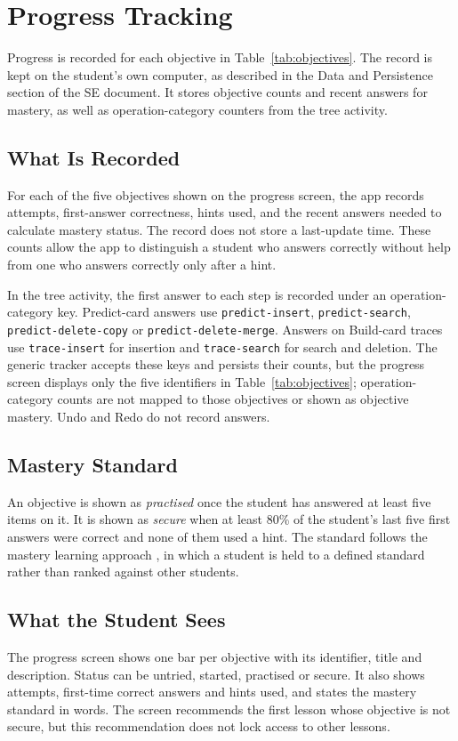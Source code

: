 \section{Progress Tracking}\label{sec:id-progress}

Progress is recorded for each objective in Table~\ref{tab:objectives}. The record is kept on the student's own computer, as described in the Data and Persistence section of the SE document. It stores objective counts and recent answers for mastery, as well as operation-category counters from the tree activity.

\subsection{What Is Recorded}
For each of the five objectives shown on the progress screen, the app records attempts, first-answer correctness, hints used, and the recent answers needed to calculate mastery status. The record does not store a last-update time. These counts allow the app to distinguish a student who answers correctly without help from one who answers correctly only after a hint.

In the tree activity, the first answer to each step is recorded under an operation-category key. Predict-card answers use \texttt{predict-insert}, \texttt{predict-search}, \texttt{predict-delete-copy} or \texttt{predict-delete-merge}. Answers on Build-card traces use \texttt{trace-insert} for insertion and \texttt{trace-search} for search and deletion. The generic tracker accepts these keys and persists their counts, but the progress screen displays only the five identifiers in Table~\ref{tab:objectives}; operation-category counts are not mapped to those objectives or shown as objective mastery. Undo and Redo do not record answers.

\subsection{Mastery Standard}
An objective is shown as \emph{practised} once the student has answered at least five items on it. It is shown as \emph{secure} when at least 80\% of the student's last five first answers were correct and none of them used a hint. The standard follows the mastery learning approach \cite{Bloom1968}, in which a student is held to a defined standard rather than ranked against other students.

\subsection{What the Student Sees}
The progress screen shows one bar per objective with its identifier, title and description. Status can be untried, started, practised or secure. It also shows attempts, first-time correct answers and hints used, and states the mastery standard in words. The screen recommends the first lesson whose objective is not secure, but this recommendation does not lock access to other lessons.

